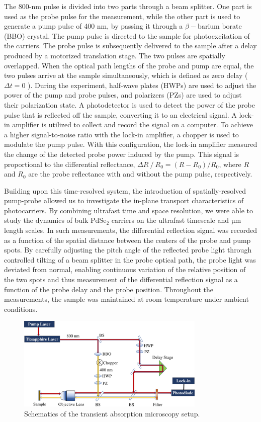 \documentclass[twoside,twocolumn,9pt]{article}
\begin{document}
The 800-nm pulse is divided into two parts through a beam splitter. One part is used as the probe pulse for the measurement, while the other part is used to generate a pump pulse of 400 nm, by passing it through a ${\beta}- $barium borate (BBO) crystal. The pump pulse is directed to the sample for photoexcitation of the carriers. The probe pulse is subsequently delivered to the sample after a delay produced by a motorized translation stage. The two pulses are spatially overlapped. When the optical path lengths of the probe and pump are equal, the two pulses arrive at the sample simultaneously, which is defined as zero delay (${\Delta} t = 0$ ). During the experiment, half-wave plates (HWPs) are used to adjust the power of the pump and probe pulses, and polarizers (PZs) are used to adjust their polarization state. A photodetector is used to detect the power of the probe pulse that is reflected off the sample, converting it to an electrical signal. A lock-in amplifier is utilized to collect and record the signal on a computer. To achieve a higher signal-to-noise ratio with the lock-in amplifier, a chopper is used to modulate the pump pulse. With this configuration, the lock-in amplifier measured the change of the detected probe power induced by the pump. This signal is proportional to the differential reflectance, $ {\Delta} R⁄R_0= (R-R_0 )/R_0$, where $R$ and $R_0$ are the probe reflectance with and without the pump pulse, respectively.

Building upon this time-resolved system, the introduction of spatially-resolved pump-probe allowed us to investigate the in-plane transport characteristics of photocarriers. By combining ultrafast time and space resolution, we were able to study the dynamics of bulk PdSe$_2$ carriers on the ultrafast timescale and µm length scales. In such measurements, the differential reflection signal was recorded as a function of the spatial distance between the centers of the probe and pump spots. By carefully adjusting the pitch angle of the reflected probe light through controlled tilting of a beam splitter in the probe optical path, the probe light was deviated from normal, enabling continuous variation of the relative position of the two spots and thus measurement of the differential reflection signal as a function of the probe delay and the probe position. Throughout the measurements, the sample was maintained at room temperature under ambient conditions.

\begin{figure}[h]
\centering
  \includegraphics[height=4.5cm]{example1}
\caption{Schematics of the transient absorption microscopy setup.}
  \label{fgr:example}
\end{figure}
\end{document}
